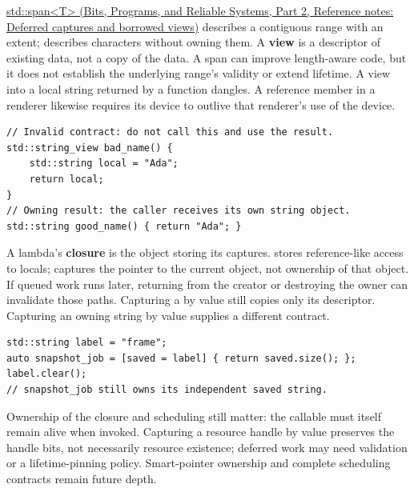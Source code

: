 \hypertarget{05-engine-i-ch003-borrowed-views-and-deferred-work-need-an-owner-story}{}

\href{../01-Bits-Programs-and-Reliable-Systems-P02/main.pdf\#appendix-aea529eb5175}{std::span\textless T\textgreater{} (Bits, Programs, and Reliable Systems, Part 2, Reference notes: Deferred captures and borrowed views)} describes a contiguous range with an extent;  describes characters without owning them. A \textbf{view} is a descriptor of existing data, not a copy of the data. A span can improve length-aware code, but it does not establish the underlying range's validity or extend lifetime. A view into a local string returned by a function dangles. A reference member in a renderer likewise requires its device to outlive that renderer's use of the device.

\begin{verbatim}
// Invalid contract: do not call this and use the result.
std::string_view bad_name() {
    std::string local = "Ada";
    return local;
}
// Owning result: the caller receives its own string object.
std::string good_name() { return "Ada"; }
\end{verbatim}

A lambda's \textbf{closure} is the object storing its captures. \BookInlineCode{{{[}}{\&}{{]}}}{{[}\&{]}} stores reference-like access to locals; \BookInlineCode{{{[}}{t}{h}{i}{s}{{]}}}{{[}this{]}} captures the pointer to the current object, not ownership of that object. If queued work runs later, returning from the creator or destroying the owner can invalidate those paths. Capturing a  by value still copies only its descriptor. Capturing an owning string by value supplies a different contract.

\begin{verbatim}
std::string label = "frame";
auto snapshot_job = [saved = label] { return saved.size(); };
label.clear();
// snapshot_job still owns its independent saved string.
\end{verbatim}

Ownership of the closure and scheduling still matter: the callable must itself remain alive when invoked. Capturing a resource handle by value preserves the handle bits, not necessarily resource existence; deferred work may need validation or a lifetime-pinning policy. Smart-pointer ownership and complete scheduling contracts remain future depth.

